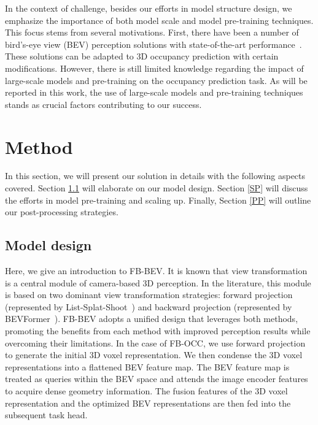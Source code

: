 \documentclass[10pt,twocolumn,letterpaper]{article}
\begin{document}
In the context of challenge, besides our efforts in model structure design, we emphasize the importance of both model scale and model pre-training techniques. This focus stems from several motivations. First, there have been a number of bird's-eye view (BEV) perception solutions with state-of-the-art performance~\cite{li2022bevformer,huang2021bevdet,li2023bevdepth}. These solutions can be adapted to 3D occupancy prediction with certain modifications. However, there is still limited knowledge regarding the impact of large-scale models and pre-training on the occupancy prediction task. As will be reported in this work, the use of large-scale models and pre-training techniques stands as crucial factors contributing to our success.

\section{Method}

In this section, we will present our solution in details with the following aspects covered. Section \ref{MSD} will elaborate on our model design. Section \ref{SP} will discuss the efforts in model pre-training and scaling up. Finally, Section \ref{PP} will outline our post-processing strategies.



\subsection{Model design}\label{MSD}

Here, we give an introduction to FB-BEV. It is known that view transformation is a central module of camera-based 3D perception. In the literature, this module is based on two dominant view transformation strategies: forward projection (represented by List-Splat-Shoot~\cite{philion2020lift}) and backward projection (represented by BEVFormer~\cite{li2022bevformer}). FB-BEV adopts a unified design that leverages both methods, promoting the benefits from each method with improved perception results while overcoming their limitations. In the case of FB-OCC, we use forward projection to generate the initial 3D voxel representation. We then condense the 3D voxel representations into a flattened BEV feature map. The BEV feature map is treated as queries within the BEV space and attends the image encoder features to acquire dense geometry information. The fusion features of the 3D voxel representation and the optimized BEV representations are then fed into the subsequent task head.
\end{document}
